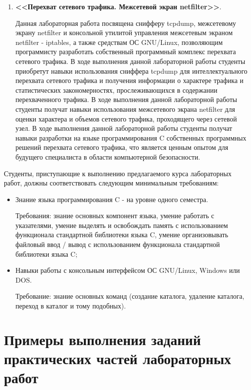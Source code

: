 \begin{enumerate}[1.]
		\item {\bf<<Перехват сетевого трафика. Межсетевой экран netfilter>>}.

			Данная лабораторная работа посвящена снифферу tcpdump, межсетевому экрану netfilter и консольной утилитой управления межсетевым экраном netfilter - iptables, а также
			средствам ОС GNU/Linux, позволяющим программисту разработать собственный программный комплекс перехвата сетевого трафика.
			В ходе выполнения данной лабораторной работы студенты приобретут навыки использования сниффера tcpdump для интеллектуального перехвата сетевого
			трафика и получения информации о характере трафика и статистических закономерностях, прослеживающихся в содержании перехваченного трафика.
			В ходе выполнения данной лабораторной работы студенты получат навыки использования межсетевого экрана netfilter для оценки характера и объемов
			сетевого трафика, проходящего через сетевой узел. В ходе выполнения данной лабораторной работы студенты получат навыки разработки на
			языке программирования C собственных программных решений перехвата сетевого трафика, что является ценным опытом для будущего специалиста в области
			компьютерной безопасности.

	\end{enumerate}

	Студенты, приступающие к выполнению предлагаемого курса лабораторных работ, должны соответствовать следующим минимальным требованиям:

	\begin{itemize}

		\item Знание языка программирования C - на уровне одного семестра.

			Требования: знание основных компонент языка, умение работать с указателями, умение выделять и освобождать память с использованием
			функционала стандартной	библиотеки языка C, умение организовывать файловый ввод / вывод с использованием функционала стандартной
			библиотеки языка C;

		\item Навыки работы с консольным интерфейсом ОС GNU/Linux, Windows или DOS.

			Требование: знание основных команд (создание каталога, удаление каталога, переход в каталог и тому подобных).

	\end{itemize}

\section{Примеры выполнения заданий практических частей лабораторных работ}

